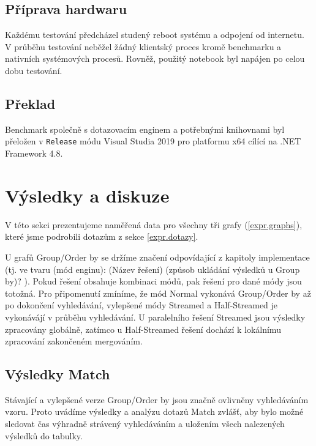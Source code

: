 \subsection{Příprava hardwaru}

Každému testování předcházel studený reboot systému a odpojení od internetu. 
V průběhu testování neběžel žádný klientský proces kromě benchmarku a nativních systémových procesů. 
Rovněž, použitý notebook byl napájen po celou dobu testování.


\subsection{Překlad}

Benchmark společně s dotazovacím enginem a potřebnými knihovnami byl přeložen v \verb+Release+ módu Visual Studia 2019 pro platformu x64 cílící na .NET Framework 4.8. 

\clearpage

\section{Výsledky a diskuze}

V této sekci prezentujeme naměřená data pro všechny tři grafy (\ref{expr.graphs}), které jsme podrobili dotazům z sekce \ref{expr.dotazy}.

U grafů Group/Order by se držíme značení odpovídající z kapitoly implementace (tj. ve tvaru (mód enginu): (Název řešení) (způsob ukládání výsledků u Group by)? ).
Pokud řešení obsahuje kombinaci módů, pak řešení pro dané módy jsou totožná.
Pro připomenutí zmíníme, že mód Normal vykonává Group/Order by až po dokončení vyhledávání, vylepšené módy Streamed a Half-Streamed je vykonávájí v průběhu vyhledávání.
U paralelního řešení Streamed jsou výsledky zpracovány globálně, zatímco u Half-Streamed řešení dochází k lokálnímu zpracování zakončeném mergováním.

\subsection{Výsledky Match}
\label{matchResults}

Stávající a vylepšené verze Group/Order by jsou značně ovlivněny vyhledáváním vzoru. 
Proto uvádíme výsledky a analýzu dotazů Match zvlášť, aby bylo možné sledovat čas výhradně strávený vyhledáváním a uložením všech nalezených výsledků do tabulky.

